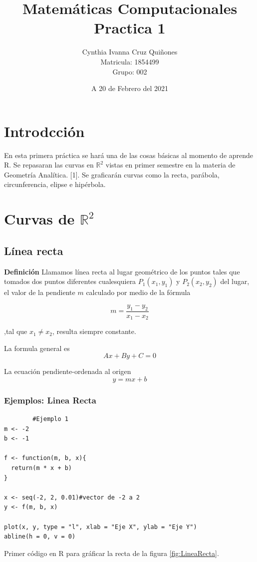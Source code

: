 \documentclass[12pt,a4paper]{article} %
\author{Cynthia Ivanna Cruz Quiñones\\
Matricula: 1854499\\
Grupo: 002}
\title{Matemáticas Computacionales\\
Practica 1}
\date{A 20 de Febrero del 2021}
\begin{document}
\maketitle

\newpage
\tableofcontents

\newpage

\section{Introdcción}
En esta primera práctica se hará una de las cosas básicas al momento de aprende R. Se
repasaran las curvas en $\mathbb{R}^2$ vistas en primer semestre en la materia de Geometría Analítica. [1].
Se graficarán curvas como la recta, parábola, circunferencia, elipse e hipérbola.

\section{Curvas de $\mathbb{R}^2$} \label{sec:curvas}

\subsection{Línea recta} \label{subsec:linearecta}
\citep{geometria}\textbf{Definición}
Llamamos línea recta al lugar geométrico de los puntos tales que tomados dos puntos diferentes cualesquiera $P_{1}(x_{1}, y_{1})$ y $P_{2}(x_{2}, y_{2})$ del lugar, el valor de la pendiente $m$ calculado por medio de la fórmula 

$$ m = \frac{y_{1} - y_{2}}{x_{1} - x_{2}}$$ 

,tal que  ${x_{1}\neq x_{2}}$, resulta siempre constante. 

La formula general es
$$Ax + By + C = 0$$

La ecuación pendiente-ordenada al origen
$$y = mx + b$$

\subsubsection{Ejemplos: Linea Recta}


\begin{table}[htpb]
	\begin{lstlisting}
		#Ejemplo 1
m <- -2 
b <- -1 

f <- function(m, b, x){
  return(m * x + b)
}

x <- seq(-2, 2, 0.01)#vector de -2 a 2
y <- f(m, b, x) 

plot(x, y, type = "l", xlab = "Eje X", ylab = "Eje Y")
abline(h = 0, v = 0) 
	\end{lstlisting}
	\caption{Primer código en R para gráficar la recta de la figura \ref{fig:LineaRecta}.}
\label{alg:LineaRecta}	
\end{table}
\end{document}
